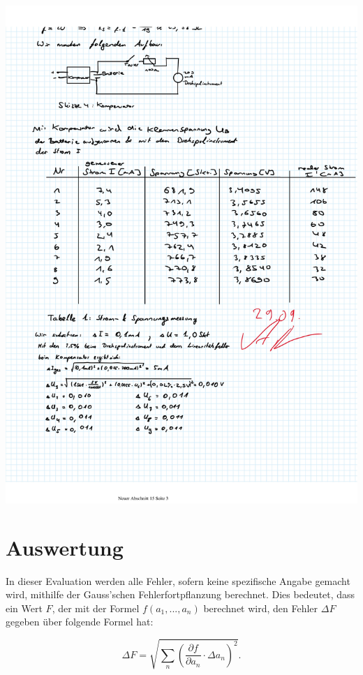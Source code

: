 \documentclass{article}
\begin{document}
\includegraphics[width=\textwidth]{graphics/mess3.jpg}
\newpage

\addtocounter{table}{1}

\section{Auswertung}

In dieser Evaluation werden alle Fehler, sofern keine spezifische Angabe gemacht wird, mithilfe der Gauss'schen Fehlerfortpflanzung berechnet. Dies bedeutet, dass ein Wert $F$, der mit der Formel $f(a_1, ..., a_n)$ berechnet wird, den Fehler $\Delta F$ gegeben über folgende Formel hat:

\begin{equation}
    \Delta F = \sqrt{\sum_n \left( \frac{\partial f}{\partial a_n} \cdot \Delta a_n \right)^2}.
\end{equation}
\end{document}
